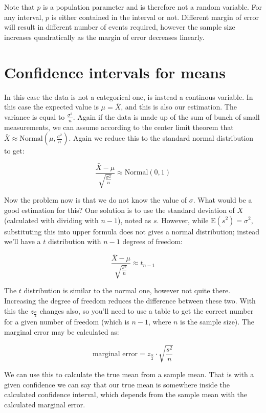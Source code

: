 Note that $p$ is a population parameter and is therefore not a random variable.
For any interval, $p$ is either contained in the interval or not. Different
margin of error will result in different number of events required, however the
sample size increases quadratically as the margin of error decreases linearly.

\section{Confidence intervals for means}

In this case the data is not a categorical one, is instead a continous variable.
In this case the expected value is $\mu = \bar{X}$, and this is also our
estimation. The variance is equal to $\frac{\sigma^2}{n}$. Again if the data is
made up of the sum of bunch of small measurements, we can assume according
to the center limit theorem that $\bar{X} \approx \mbox{Normal}\left(\mu,
\frac{\sigma^2}{n}\right).$ Again we reduce this to the standard normal
distribution to get:

\[ \frac{\bar{X}-\mu}{\sqrt{\frac{\sigma^2}{n}}}  \approx \mbox{Normal}
\left( 0, 1\right)
\]

Now the problem now is that we do not know the value of $\sigma$. What would be
a good estimation for this? One solution is to use the standard deviation of $X$
(calculated with dividing with $n-1$), noted as $s$. However, while
$\mbox{E}(s^2)=\sigma^2$, substituting this into upper formula does not gives a
normal distribution; instead we'll have a $t$ distribution with $n-1$ degrees of
freedom:


\[ \frac{\bar{X}-\mu}{\sqrt{\frac{s^2}{n}}}  \approx t_{n-1}
\]

The $t$ distribution is similar to the normal one, however not quite there.
Increasing the degree of freedom reduces the difference between these two.
With this the $z_{\frac{\alpha}{2}}$ changes also, so you'll need to use a table
to get the correct number for a given number of freedom (which is $n-1$, where $n$ is
the sample size). The marginal error may be calculated as:

\[ \mbox{marginal error}= z_{\frac{\alpha}{2}} \cdot \sqrt{\frac{s^2}{n}} \]

We can use this to calculate the true mean from a sample mean. That is with a
given confidence we can say that our true mean is somewhere inside the
calculated confidence interval, which depends from the sample mean with the
calculated marginal error.

